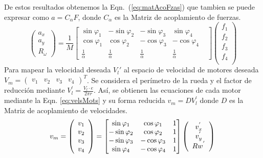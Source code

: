 \documentclass[twocolumn,10pt]{amrob}
\begin{document}
De estos resultados obtenemos la Eqn.~(\ref{eq:matAcoFzas}) que  tambien se puede expresar como $a=C_\alpha F$, donde $C_\alpha$ es la Matriz de acoplamiento de fuerzas.
\begin{equation}
  \left(\begin{array}{c}
    a_x \\ a_y \\R_{\dot{\omega}}
  \end{array}\right)= \frac{1}{M}
  \begin{bmatrix}
    \sin\varphi_1 & -\sin\varphi_2 & -\sin\varphi_3 & \sin\varphi_4 \\
    \cos\varphi_1 & \cos\varphi_2 & -\cos\varphi_3 & -\cos\varphi_4 & \\
    \frac{1}{\alpha} & \frac{1}{\alpha}  & \frac{1}{\alpha}  &\frac{1}{\alpha} 
  \end{bmatrix}
  \left(\begin{array}{c}
    f_1 \\ f_2 \\ f_3 \\ f_4  \label{eq:matAcoFzas}\\ 
  \end{array}\right) 
\end{equation}
Para mapear la velocidad deseada $V_{l}'$ al espacio de velocidad de motores deseada $V_m= \begin {pmatrix} v_1 & v_2 & v_3 & v_4 \end{pmatrix}^{T} $. Se considera el perímetro de la rueda y el factor de reducción mediante $V_{l}^{'} = \frac{ V_l \cdot e } { 2 \pi r}$. Así, se obtienen las ecuaciones de cada motor mediante la Eqn. \eqref{eq:velsMots}  y su forma reducida $v_m = D V_{l}^{'}$ donde $D$ es la Matriz de acoplamiento de velocidades. 
\begin{equation}
  v_m = 
    \left(\begin{array}{c}
      v_1 \\ v_2 \\ v_3 \\ v_4 
    \end{array}\right)
    = 
    \begin{bmatrix}
      \sin\varphi_1 & \cos\varphi_1 & 1 \\
      -\sin\varphi_2 & \cos\varphi_2 & 1 \\
      -\sin\varphi_3 & -\cos\varphi_3 & 1 \\
      \sin\varphi_4 & -\cos\varphi_4 & 1 \\
    \end{bmatrix}
    \left(\begin{array}{c}
      v_x^{'}  \\ v_y^{'}  \\ {Rw}^{'} 
    \end{array} \right) \label{eq:velsMots} \\
\end{equation}
\end{document}
